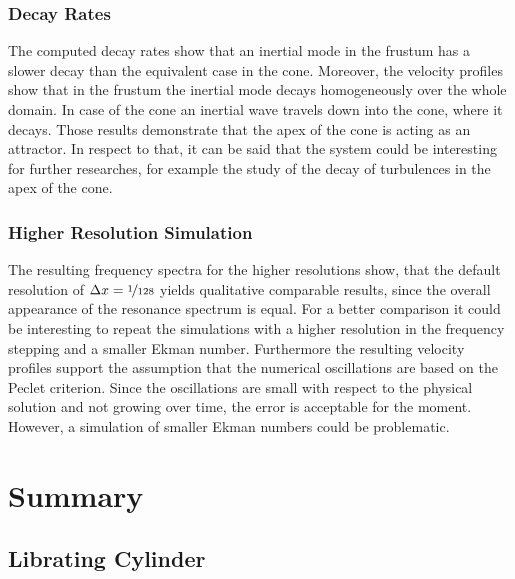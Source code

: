 \subsubsection{Decay Rates}

The computed decay rates show that an inertial mode in the frustum has a slower decay
than the equivalent case in the cone.
Moreover, the velocity profiles show that in the frustum the inertial mode decays homogeneously over the whole domain.
In case of the cone an inertial wave travels down into the cone, where it decays.
Those results demonstrate that the apex of the cone is acting as an attractor.
In respect to that, it can be said that the system could be interesting for further researches,
for example the study of the decay of turbulences in the apex of the cone.

\subsubsection{Higher Resolution Simulation}

The resulting frequency spectra for the higher resolutions show,
that the default resolution of ${\Delta x = \nicefrac{1}{128}}$ yields
qualitative comparable results, since the overall appearance of the resonance spectrum
is equal.
For a better comparison it could be interesting to repeat the simulations with a
higher resolution in the frequency stepping and a smaller Ekman number.
Furthermore the resulting velocity profiles support the assumption
that the numerical oscillations are based on the Peclet criterion.
Since the oscillations are small with respect to the physical solution and not
growing over time, the error is acceptable for the moment.
However, a simulation of smaller Ekman numbers could be problematic.
\clearpage

\section{Summary}

\subsection{Librating Cylinder}


